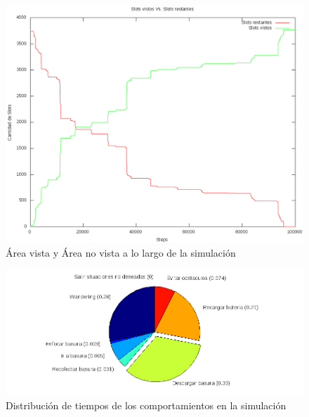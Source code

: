 \begin{figure}[htp]
\begin{center}
\includegraphics[scale=0.25]{comportamientos/graphics/areaCoveredVsTimeUse.png}
\caption{\'Area vista y \'Area no vista a lo largo de la simulaci\'on}
\label{fig:seenArea}
\end{center}
\end{figure}

\begin{figure}[htp]
\begin{center}
\includegraphics[scale=0.3]{comportamientos/graphics/BehaviourDistributionPieUse.png}
\caption{Distribuci\'on de tiempos de los comportamientos en la simulaci\'on}
\label{fig:behaviourDistribution}
\end{center}
\end{figure}


